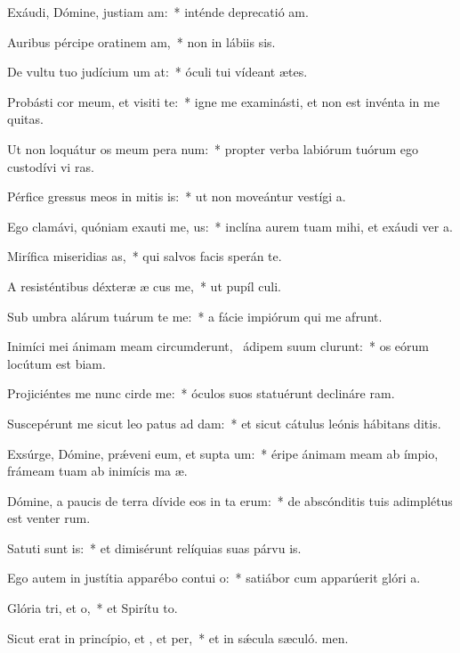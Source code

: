 \item Exáudi, Dómine, justiam am:~* inténde deprecatió am.
\item Auribus pércipe oratinem am,~* non in lábiis sis.
\item De vultu tuo judícium um at:~* óculi tui vídeant ætes.
\item Probásti cor meum, et visiti te:~* igne me examinásti, et non est invénta in me quitas.
\item Ut non loquátur os meum pera num:~* propter verba labiórum tuórum ego custodívi vi ras.
\item Pérfice gressus meos in mitis is:~* ut non moveántur vestígi a.
\item Ego clamávi, quóniam exauti me, us:~* inclína aurem tuam mihi, et exáudi ver a.
\item Mirífica miseridias as,~* qui salvos facis sperán  te.
\item A resisténtibus déxteræ æ cus me,~* ut pupíl culi.
\item Sub umbra alárum tuárum te me:~* a fácie impiórum qui me afrunt.
\item Inimíci mei ánimam meam circumderunt,~\pscross{} ádipem suum clurunt:~* os eórum locútum est biam.
\item Projiciéntes me nunc cirde me:~* óculos suos statuérunt declináre  ram.
\item Suscepérunt me sicut leo patus ad dam:~* et sicut cátulus leónis hábitans  ditis.
\item Exsúrge, Dómine, prǽveni eum, et supta um:~* éripe ánimam meam ab ímpio, frámeam tuam ab inimícis ma æ.
\item Dómine, a paucis de terra dívide eos in ta erum:~* de abscónditis tuis adimplétus est venter rum.
\item Satuti sunt is:~* et dimisérunt relíquias suas párvu is.
\item Ego autem in justítia apparébo contui o:~* satiábor cum apparúerit glóri a.
\item Glória tri, et o,~* et Spirítu to.
\item Sicut erat in princípio, et , et per,~* et in sǽcula sæculó. men.
